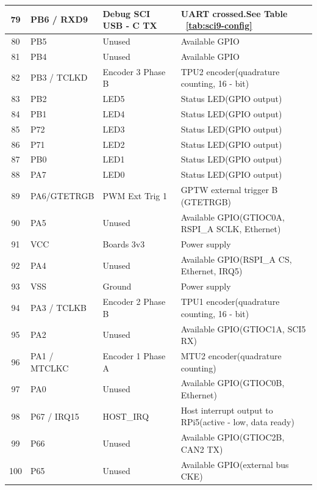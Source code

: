 \begin{longtable} { | c | l | l | p{5cm} |}
\\
\hline
\rowcolor{yellow!15}
79 & PB6 / RXD9 &Debug SCI USB - C TX &UART crossed.See Table ~\ref{tab:sci9-config}
\\
\hline
80 & PB5 & Unused & Available GPIO \\
\hline
81 & PB4 & Unused & Available GPIO \\
\hline
\rowcolor{green!20}
82 & PB3 / TCLKD &Encoder 3 Phase B &TPU2 encoder(quadrature counting, 16 - bit) \\
\hline
\rowcolor{teal!15}
83 & PB2 & LED5 &Status LED(GPIO output) \\
\hline
\rowcolor{teal!15}
84 & PB1 & LED4 &Status LED(GPIO output) \\
\hline
\rowcolor{teal!15}
85 & P72 & LED3 &Status LED(GPIO output) \\
\hline
\rowcolor{teal!15}
86 & P71 & LED2 &Status LED(GPIO output) \\
\hline
\rowcolor{teal!15}
87 & PB0 & LED1 &Status LED(GPIO output) \\
\hline
\rowcolor{teal!15}
88 & PA7 & LED0 &Status LED(GPIO output) \\
\hline
\rowcolor{lime!10}
89 & PA6/GTETRGB & PWM Ext Trig 1 & GPTW external trigger B (GTETRGB) \\
\hline
90 &
    PA5 & Unused &Available GPIO(GTIOC0A, RSPI\_A SCLK, Ethernet) \\
\hline
\rowcolor{gray!15}
91 & VCC &Boards 3v3 & Power supply \\
\hline
92 & PA4 & Unused &Available GPIO(RSPI\_A CS, Ethernet, IRQ5) \\
\hline
\rowcolor{gray!15}
93 & VSS & Ground &Power supply \\
\hline
\rowcolor{green!20}
94 & PA3 / TCLKB &Encoder 2 Phase B &TPU1 encoder(quadrature counting, 16 - bit) \\
\hline
95 & PA2 & Unused &Available GPIO(GTIOC1A, SCI5 RX) \\
\hline
\rowcolor{green!20}
96 & PA1 / MTCLKC &Encoder 1 Phase A &MTU2 encoder(quadrature counting) \\
\hline
97 & PA0 & Unused &Available GPIO(GTIOC0B, Ethernet) \\
\hline
\rowcolor{orange!20}
98 &
    P67 / IRQ15 &HOST\_IRQ &Host interrupt output to RPi5(active - low,
                                                          data ready) \\
\hline
99 &
    P66 & Unused &Available GPIO(GTIOC2B, CAN2 TX) \\
\hline
100 & P65 & Unused &Available GPIO(external bus CKE) \\

\end{longtable}
